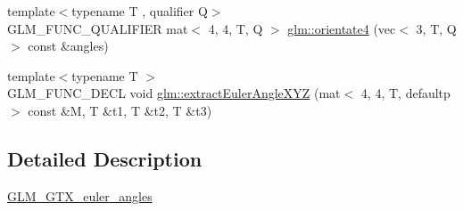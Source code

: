 \begin{DoxyCompactItemize}
\item 
{\footnotesize template$<$typename T , qualifier Q$>$ }\\G\+L\+M\+\_\+\+F\+U\+N\+C\+\_\+\+Q\+U\+A\+L\+I\+F\+I\+ER mat$<$ 4, 4, T, Q $>$ \hyperlink{group__gtx__euler__angles_ga4a044653f71a4ecec68e0b623382b48a}{glm\+::orientate4} (vec$<$ 3, T, Q $>$ const \&angles)
\item 
{\footnotesize template$<$typename T $>$ }\\G\+L\+M\+\_\+\+F\+U\+N\+C\+\_\+\+D\+E\+CL void \hyperlink{group__gtx__euler__angles_gacea701562f778c1da4d3a0a1cf091000}{glm\+::extract\+Euler\+Angle\+X\+YZ} (mat$<$ 4, 4, T, defaultp $>$ const \&M, T \&t1, T \&t2, T \&t3)
\end{DoxyCompactItemize}


\subsection{Detailed Description}
\hyperlink{group__gtx__euler__angles}{G\+L\+M\+\_\+\+G\+T\+X\+\_\+euler\+\_\+angles} 